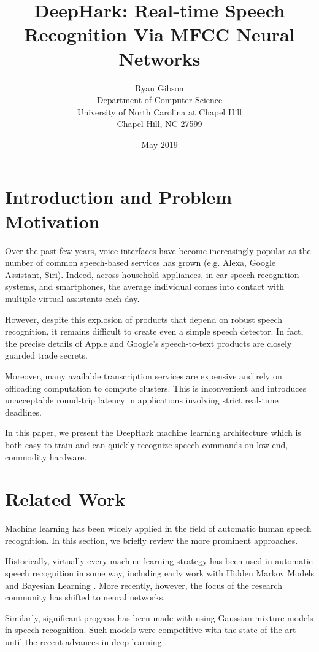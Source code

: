 \documentclass[12pt]{article}
\title{DeepHark: Real-time Speech Recognition Via MFCC Neural Networks}
\author{Ryan Gibson\\
Department of Computer Science\\
University of North Carolina at Chapel Hill\\
Chapel Hill, NC 27599}
\date{May 2019}
\begin{document}
\maketitle

\section{Introduction and Problem Motivation}

Over the past few years, voice interfaces have become increasingly popular as the number of common speech-based services has grown (e.g. Alexa, Google Assistant, Siri). Indeed, across household appliances, in-car speech recognition systems, and smartphones, the average individual comes into contact with multiple virtual assistants each day.

However, despite this explosion of products that depend on robust speech recognition, it remains difficult to create even a simple speech detector. In fact, the precise details of Apple and Google's speech-to-text products are closely guarded trade secrets.

Moreover, many available transcription services are expensive and rely on offloading computation to compute clusters. This is inconvenient and introduces unacceptable round-trip latency in applications involving strict real-time deadlines.

In this paper, we present the DeepHark machine learning architecture which is both easy to train and can quickly recognize speech commands on low-end, commodity hardware.

\section{Related Work}

Machine learning has been widely applied in the field of automatic human speech recognition. In this section, we briefly review the more prominent approaches.

Historically, virtually every machine learning strategy has been used in automatic speech recognition in some way, including early work with Hidden Markov Models and Bayesian Learning \cite{deng_machine_2013}. More recently, however, the focus of the research community has shifted to neural networks.

Similarly, significant progress has been made with using Gaussian mixture models in speech recognition. Such models were competitive with the state-of-the-art until the recent advances in deep learning \cite{deng_new_2013}.
\end{document}
